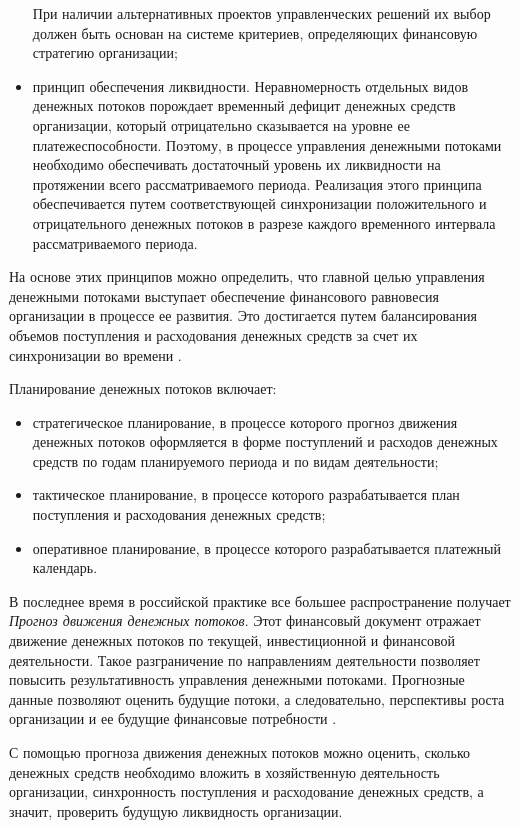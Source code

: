 \begin{itemize}
	При наличии альтернативных проектов управленческих решений их выбор должен быть основан на системе критериев, определяющих финансовую стратегию организации;
	\item принцип обеспечения ликвидности.
	Неравномерность отдельных видов денежных потоков порождает временный дефицит денежных средств организации, который отрицательно сказывается на уровне ее платежеспособности.
	Поэтому, в процессе управления денежными потоками необходимо обеспечивать достаточный уровень их ликвидности на протяжении всего рассматриваемого периода.
	Реализация этого принципа обеспечивается путем соответствующей синхронизации положительного и отрицательного денежных потоков в разрезе каждого временного интервала рассматриваемого периода.
\end{itemize}

На основе этих принципов можно определить, что главной целью управления денежными потоками выступает обеспечение финансового равновесия организации в процессе ее развития.
Это достигается путем балансирования объемов поступления и расходования денежных средств за счет их синхронизации во времени \cite[137--140]{kirichenko}.

Планирование денежных потоков включает:
\begin{itemize}
	\item стратегическое планирование, в процессе которого прогноз движения денежных потоков оформляется в форме поступлений и расходов денежных средств по годам планируемого периода и по видам деятельности;
	\item тактическое планирование, в процессе которого разрабатывается план поступления и расходования денежных средств;
	\item оперативное планирование, в процессе которого разрабатывается платежный календарь.
\end{itemize}

В последнее время в российской практике все большее распространение получает \textit{Прогноз движения денежных потоков}.
Этот финансовый документ отражает движение денежных потоков по текущей, инвестиционной и финансовой деятельности.
Такое разграничение по направлениям деятельности позволяет повысить результативность управления денежными потоками.
Прогнозные данные позволяют оценить будущие потоки, а следовательно, перспективы роста организации и ее будущие финансовые потребности \cite[174--175]{kirichenko}.

С помощью прогноза движения денежных потоков можно оценить, сколько денежных средств необходимо вложить в хозяйственную деятельность организации, синхронность поступления и расходование денежных средств, а значит, проверить будущую ликвидность организации.

